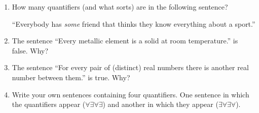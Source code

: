 \begin{enumerate}

\item How many quantifiers (and what sorts) are in the following sentence?

``Everybody has \emph{some} friend that thinks they know everything about 
a sport.''
  

\item The sentence ``Every metallic element is a solid at room temperature.'' 
is false.  Why?

\item The sentence ``For every pair of (distinct) real numbers there is 
another real number between them.'' is true.  Why?

\item Write your own sentences containing four quantifiers.  One
sentence in which the quantifiers appear ($\forall \exists \forall \exists$)
and another in which they appear ($\exists \forall \exists \forall$).

\end{enumerate}
